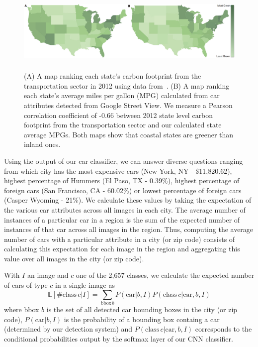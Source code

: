 \documentclass[letterpaper]{article}
\begin{document}
\begin{figure} [t]
\begin{center}
\includegraphics[width=0.9\linewidth,height=1.6in ]{img/green.jpg}
\end{center}
\caption {(A) A map ranking each state's carbon footprint from the transportation sector in 2012 using data from~\cite{state_ranking}. (B) A map ranking each state's average miles per gallon (MPG) calculated from car attributes detected from Google Street View. We measure a Pearson correlation coefficient of -0.66 between 2012 state level carbon footprint from the transportation sector and our calculated state average MPGs. Both maps show that coastal states are greener than inland ones.}
\label{fig:mpg}
\end{figure}
Using the output of our car classifier, we can answer diverse questions ranging from which city has the most expensive cars (New York, NY - \$11,820.62), highest percentage of Hummers (El Paso, TX - 0.39\%), highest percentage of foreign cars (San Francisco, CA - 60.02\%) or lowest percentage of foreign cars (Casper Wyoming - 21\%). We calculate these values by taking the expectation of the various car attributes across all images in each city. The average number of instances of a particular car in a region is the sum of the expected number of instances of that car across all images in the region. Thus, computing the average number of cars with a particular attribute in a city (or zip code) consists of calculating this expectation for each image in the region and aggregating this value over all images in the city (or zip code).

With $I$ an image and $c$ one of the 2,657 classes, we calculate the expected number of cars of type $c$ in a single image as
\begin{equation}
\mathbb{E}[\mathrm{\#class}\, c | I] = \sum_{\mathrm{bbox}\,b} P(\mathrm{car}|b,I) P(\mathrm{class}\, c | \mathrm{car},b,I)
\end{equation}
where bbox $b$ is the set of all detected car bounding boxes in the city (or zip code), $P(\mathrm{car}|b,I)$ is the probability of a bounding box containg a car (determined by our detection system) and $P(\mathrm{class}\, c | \mathrm{car},b,I)$ corresponds to the conditional probabilities output by the softmax layer of our CNN classifier.
\end{document}
